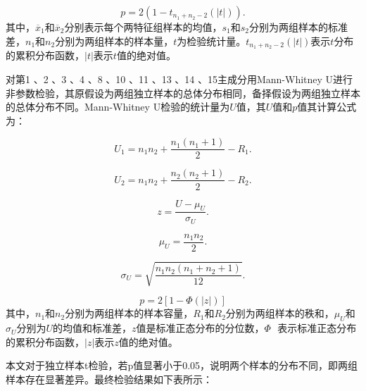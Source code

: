 \begin{equation}
    p=2\left( 1-{{t}_{{{n}_{1}}+{{n}_{2}}-2}}(|t|) \right).
\end{equation}
其中，${{\overline{x}}_{1}}$和${{\overline{x}}_{2}}$分别表示每个两特征组样本的均值，${{s}_{1}}$和${{s}_{2}}$分别为两组样本的标准差，${{n}_{1}}$和${{n}_{2}}$分别为两组样本的样本量，$t$为检验统计量。${{t}_{{{n}_{1}}+{{n}_{2}}-2}}(|t|)$表示$t$分布的累积分布函数，$|t|$表示$t$值的绝对值。


对第1 、2 、3 、4 、8 、10 、11 、13 、14 、15主成分用Mann-Whitney U进行非参数检验，其原假设为两组独立样本的总体分布相同，备择假设为两组独立样本的总体分布不同。Mann-Whitney U检验的统计量为$U$值，其$U$值和$p$值其计算公式为：

\begin{equation}
    {{U}_{1}}={{n}_{1}}{{n}_{2}}+\frac{{{n}_{1}}({{n}_{1}}+1)}{2}-{{R}_{1}}.
\end{equation}

\begin{equation} 
    {{U}_{2}}={{n}_{1}}{{n}_{2}}+\frac{{{n}_{2}}({{n}_{2}}+1)}{2}-{{R}_{2}}.
\end{equation}
 
\begin{equation}
    z=\frac{U-{{\mu }_{U}}}{{{\sigma }_{U}}}.
\end{equation}

\begin{equation}
    {{\mu }_{U}}=\frac{{{n}_{1}}{{n}_{2}}}{2}.
\end{equation}
    
\begin{equation}
    {{\sigma }_{U}}=\sqrt{\frac{{{n}_{1}}{{n}_{2}}({{n}_{1}}+{{n}_{2}}+1)}{12}}.
\end{equation}

\begin{equation}
    p=2[1-\Phi (|z|)]
\end{equation}
其中，${{n}_{1}}$和${{n}_{2}}$分别为两组样本的样本容量，${{R}_{1}}$和${{R}_{2}}$分别为两组样本的秩和，${{\mu }_{U}}$和${{\sigma }_{U}}$分别为$U$的均值和标准差，$z$值是标准正态分布的分位数，$\Phi \text{ }$表示标准正态分布的累积分布函数，$|z|$表示$z$值的绝对值。

本文对于独立样本t检验，若p值显著小于0.05，说明两个样本的分布不同，即两组样本存在显著差异。最终检验结果如下表所示：

